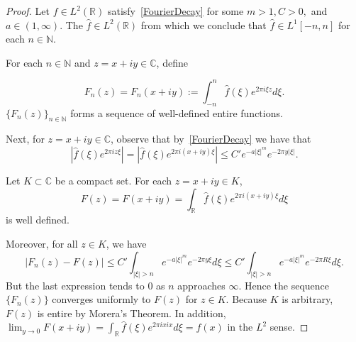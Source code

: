 \documentclass[graybox]{svmult}
\newcommand{\R}{\mathbb{R}}
\newcommand{\C}{\mathbb{C}}
\newcommand{\N}{\mathbb{N}}
\begin{document}
\begin{proof}
 Let $f\in L^2(\R)$ satisfy~\eqref{FourierDecay} for some $m>1, C>0, $ and $a\in (1, \infty)$. The $\hat{f} \in L^2(\R)$ from which we conclude that $\hat{f} \in L^1[-n,n]$ for each $n \in \N$.

    For each $n \in \N$ and $z=x+iy \in \C$, define 

\begin{equation*}
    F_n(z) =F_n(x+iy):= \int_{-n}^n \hat{f}(\xi)e^{2 \pi i \xi z}d\xi.
\end{equation*}
$\{F_n(z)\}_{n\in \N}$ forms a sequence of well-defined entire functions. 


Next, for $z=x+iy \in \C$, observe that by~\eqref{FourierDecay} we have that 
$$|\hat{f}(\xi)e^{2 \pi i z \xi}|=|\hat{f}(\xi)e^{2 \pi i (x+iy) \xi}| \leq C' e^{-a|\xi|^m}e^{-2 \pi y |\xi|}.$$



Let $K\subset \C$ be a compact set. For each $z=x+iy\in K$, 
\begin{equation}\label{inverseFourierextension}
    F(z) = F(x+iy) = \int_{\R}\hat{f}(\xi) e^{2 \pi i (x+iy) \xi}d\xi
\end{equation}
is well defined. 


Moreover, for all $z \in K$, we have
\begin{equation*}
    |F_n(z) - F(z)|\leq C' \int_{|\xi|>n} e^{-a|\xi|^m}e^{-2 \pi y \xi}d\xi\leq C' \int_{|\xi|>n} e^{-a|\xi|^m}e^{-2 \pi R \xi}d\xi .
\end{equation*}
But the last expression tends to $0$ as $n$ approaches $\infty$. 
Hence the sequence $\{ F_n(z) \}$ converges uniformly to $F(z)$ for $z \in K$. Because $K$ is arbitrary, $F(z)$ is entire by Morera's Theorem. In addition, $\lim_{y\to 0} F(x+iy)=\int_{\R}\hat{f}(\xi)e^{2\pi i xi x} d\xi=f(x)$ in the $L^2$ sense. 

\end{proof}
\end{document}

